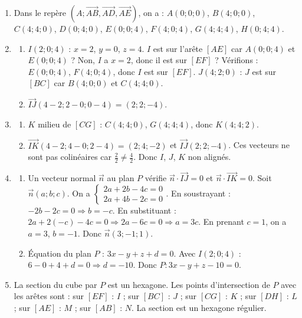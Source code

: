 \begin{enumerate}[label=\arabic*)]
\item Dans le repère $(A;\vec{AB},\vec{AD},\vec{AE})$, on a : $A(0;0;0)$, $B(4;0;0)$, $C(4;4;0)$, $D(0;4;0)$, $E(0;0;4)$, $F(4;0;4)$, $G(4;4;4)$, $H(0;4;4)$.
\item \begin{enumerate}[label=\alph*)]
\item $I(2;0;4)$ : $x=2$, $y=0$, $z=4$. $I$ est sur l'arête $[AE]$ car $A(0;0;4)$ et $E(0;0;4)$ ? Non, $I$ a $x=2$, donc il est sur $[EF]$ ? Vérifions : $E(0;0;4)$, $F(4;0;4)$, donc $I$ est sur $[EF]$. $J(4;2;0)$ : $J$ est sur $[BC]$ car $B(4;0;0)$ et $C(4;4;0)$.
\item $\overrightarrow{IJ}(4-2;2-0;0-4)=(2;2;-4)$.
\end{enumerate}
\item \begin{enumerate}[label=\alph*)]
\item $K$ milieu de $[CG]$ : $C(4;4;0)$, $G(4;4;4)$, donc $K(4;4;2)$.
\item $\overrightarrow{IK}(4-2;4-0;2-4)=(2;4;-2)$ et $\overrightarrow{IJ}(2;2;-4)$. Ces vecteurs ne sont pas colinéaires car $\frac{2}{2}\neq\frac{4}{2}$. Donc $I$, $J$, $K$ non alignés.
\end{enumerate}
\item \begin{enumerate}[label=\alph*)]
\item Un vecteur normal $\vec{n}$ au plan $P$ vérifie $\vec{n}\cdot\overrightarrow{IJ}=0$ et $\vec{n}\cdot\overrightarrow{IK}=0$. Soit $\vec{n}(a;b;c)$. On a $\begin{cases} 2a+2b-4c=0 \\ 2a+4b-2c=0 \end{cases}$. En soustrayant : $-2b-2c=0 \Rightarrow b=-c$. En substituant : $2a+2(-c)-4c=0 \Rightarrow 2a-6c=0 \Rightarrow a=3c$. En prenant $c=1$, on a $a=3$, $b=-1$. Donc $\vec{n}(3;-1;1)$.
\item Équation du plan $P$ : $3x-y+z+d=0$. Avec $I(2;0;4)$ : $6-0+4+d=0 \Rightarrow d=-10$. Donc $P:3x-y+z-10=0$.
\end{enumerate}
\item La section du cube par $P$ est un hexagone. Les points d'intersection de $P$ avec les arêtes sont : sur $[EF]$ : $I$ ; sur $[BC]$ : $J$ ; sur $[CG]$ : $K$ ; sur $[DH]$ : $L$ ; sur $[AE]$ : $M$ ; sur $[AB]$ : $N$. La section est un hexagone régulier.
\end{enumerate}

